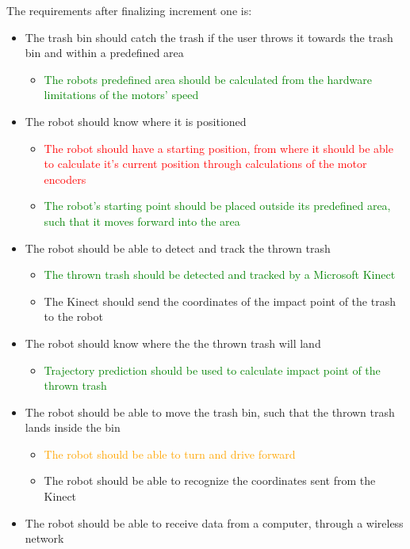 The requirements after finalizing increment one is:
\begin{itemize}
\item The trash bin should catch the trash if the user throws it towards the trash bin and within a predefined area
\begin{itemize}
	\item \textcolor{green}{The robots predefined area should be calculated from the hardware limitations of the motors’ speed}
\end{itemize}
\item The robot should know where it is positioned
\begin{itemize}
	\item \textcolor{red}{The robot should have a starting position, from where it should be able to calculate it's current position through calculations of the motor encoders}
	\item \textcolor{green}{The robot's starting point should be placed outside its predefined area, such that it moves forward into the area}
\end{itemize}
\item The robot should be able to detect and track the thrown trash
\begin{itemize}
	\item \textcolor{green}{The thrown trash should be detected and tracked by a Microsoft Kinect}
	\item The Kinect should send the coordinates of the impact point of the trash to the robot
\end{itemize}
\item The robot should know where the the thrown trash will land
\begin{itemize}
	\item \textcolor{green}{Trajectory prediction should be used to calculate impact point of the thrown trash}
\end{itemize}
\item The robot should be able to move the trash bin, such that the thrown trash lands inside the bin
\begin{itemize}
	\item \textcolor{orange}{The robot should be able to turn and drive forward}
	\item {The robot should be able to recognize the coordinates sent from the Kinect}
\end{itemize}
\item {The robot should be able to receive data from a computer, through a wireless network}
\end{itemize}
